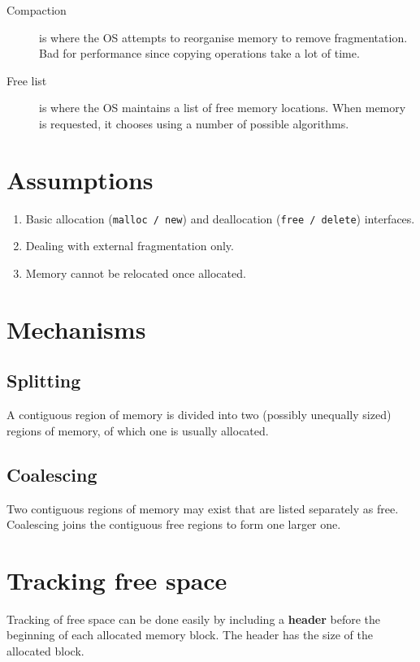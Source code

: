\begin{description}
\item[Compaction] is where the OS attempts to reorganise memory to remove fragmentation.
  Bad for performance since copying operations take a lot of time.
\item[Free list] is where the OS maintains a list of free memory locations.
  When memory is requested, it chooses using a number of possible algorithms.
\end{description}


\section{Assumptions}

\begin{enumerate}
\item Basic allocation (\texttt{malloc / new}) and deallocation (\texttt{free / delete}) interfaces.
\item Dealing with external fragmentation only.
\item Memory cannot be relocated once allocated.
\end{enumerate}


\section{Mechanisms}

\subsection{Splitting}

A contiguous region of memory is divided into two (possibly unequally sized) regions of memory, of which one is usually allocated.

\subsection{Coalescing}

Two contiguous regions of memory may exist that are listed separately as free.
Coalescing joins the contiguous free regions to form one larger one.


\section{Tracking free space}

Tracking of free space can be done easily by including a \textbf{header} before the beginning of each allocated memory block.
The header has the size of the allocated block.

